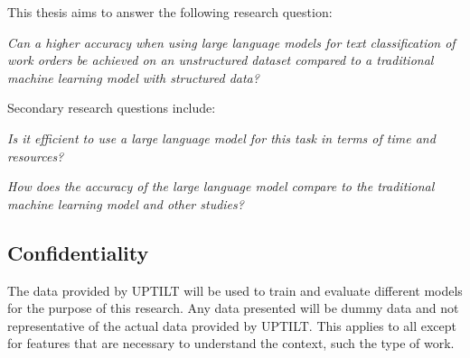 This thesis aims to answer the following research question:

\bigskip
\textit{Can a higher accuracy when using large language models for
    text classification of work orders be achieved on an unstructured dataset
    compared to a traditional machine learning model with structured data?}

\bigskip
\noindent
Secondary research questions include:

\bigskip
\textit{Is it efficient to use a large language model for this task in terms of
    time and resources?}

\bigskip
\textit{How does the accuracy of the large language model compare to the
    traditional machine learning model and other studies?}

\subsection{Confidentiality}

The data provided by UPTILT will be used to train and evaluate different models
for the purpose of this research. Any data presented will be dummy data and not
representative of the actual data provided by UPTILT. This applies to all except
for features that are necessary to understand the context, such the type of
work.
